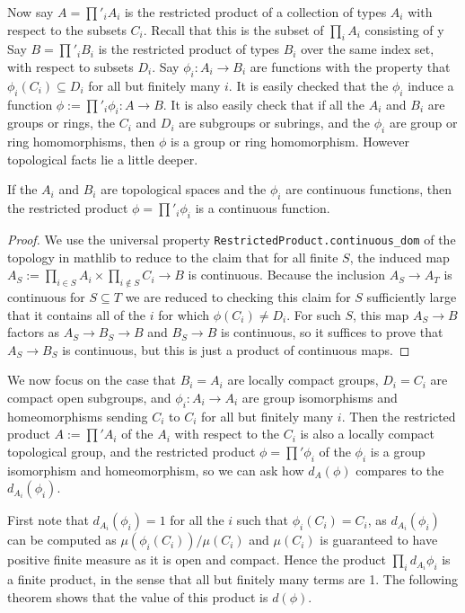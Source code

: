 Now say $A=\prod'_i A_i$ is the restricted product of a collection of types $A_i$
  with respect to the subsets $C_i$. Recall that this is the subset of $\prod_i A_i$
  consisting of y Say $B=\prod'_i B_i$ is the restricted
  product of types $B_i$ over the same index set, with respect to
  subsets $D_i$. Say $\phi_i:A_i\to B_i$ are functions
  with the property that $\phi_i(C_i)\subseteq D_i$ for all but finitely many $i$.
It is easily checked that the $\phi_i$ induce a function $\phi:=\prod'_i\phi_i:A\to B$. It is also easily
check that if all the $A_i$ and $B_i$ are groups or rings, the $C_i$ and $D_i$ are subgroups
or subrings,
and the $\phi_i$ are group or ring homomorphisms, then $\phi$ is a group or ring homomorphism.
However topological facts lie a little deeper.

\begin{lemma}
  \label{Continuous.restrictedProduct_congrRight}
  \leanok
  If the $A_i$ and $B_i$ are topological spaces and the $\phi_i$ are continuous functions,
  then the restricted product $\phi = \prod'_i\phi_i$ is a continuous function.
\end{lemma}
\begin{proof}
  \leanok
  We use the universal property {\tt RestrictedProduct.continuous\_dom} of the
  topology in mathlib to reduce to the claim that for all finite $S$,
  the induced map $A_S:=\prod_{i\in S}A_i\times\prod_{i\notin S}C_i\to B$ is continuous.
  Because the inclusion $A_S\to A_T$ is continuous for $S\subseteq T$ we are reduced
  to checking this claim for $S$ sufficiently large that it contains all of the $i$
  for which $\phi(C_i)\not=D_i$. For such $S$, this map $A_S\to B$ factors as $A_S\to B_S\to B$
  and $B_S\to B$ is continuous, so it suffices to prove that $A_S\to B_S$ is continuous, but
  this is just a product of continuous maps.
\end{proof}

We now focus on the case that $B_i=A_i$ are locally compact groups, $D_i=C_i$ are compact
open subgroups, and $\phi_i:A_i\to A_i$ are group isomorphisms and homeomorphisms sending
$C_i$ to $C_i$ for all but finitely many $i$. Then the restricted product $A:=\prod'A_i$
of the $A_i$ with respect to the $C_i$ is also a locally compact topological group, and the
restricted product $\phi=\prod'\phi_i$ of the $\phi_i$ is a group isomorphism and homeomorphism,
so we can ask how $d_A(\phi)$ compares to the $d_{A_i}(\phi_i)$.

First note that $d_{A_i}(\phi_i)=1$ for all the $i$ such that $\phi_i(C_i)=C_i$, as
$d_{A_i}(\phi_i)$ can be computed as $\mu(\phi_i(C_i))/\mu(C_i)$ and $\mu(C_i)$ is
guaranteed to have positive finite measure as it is open and compact. Hence the product
$\prod_id_{A_i}\phi_i$ is a finite product, in the sense that all but finitely many terms are 1.
The following theorem shows that the value of this product is $d(\phi)$.

